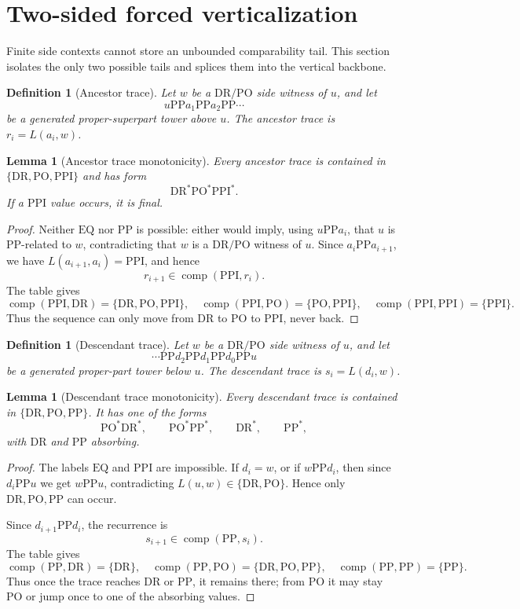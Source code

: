 \documentclass[11pt]{article}
\newtheorem{lemma}[theorem]{Lemma}
\newtheorem{definition}[theorem]{Definition}
\newcommand{\comp}{\operatorname{comp}}
\newcommand{\PP}{\mathrm{PP}}
\newcommand{\PPI}{\mathrm{PPI}}
\newcommand{\DR}{\mathrm{DR}}
\newcommand{\PO}{\mathrm{PO}}
\newcommand{\EQ}{\mathrm{EQ}}
\begin{document}
\section{Two-sided forced verticalization}

Finite side contexts cannot store an unbounded comparability tail.  This section isolates the only two possible tails and splices them into the vertical backbone.

\begin{definition}[Ancestor trace]
Let $w$ be a $\DR/\PO$ side witness of $u$, and let
\[
   u\PP a_1\PP a_2\PP\cdots
\]
be a generated proper-superpart tower above $u$.  The ancestor trace is $r_i=L(a_i,w)$.
\end{definition}

\begin{lemma}[Ancestor trace monotonicity]
\label{lem:ancestor-trace}
Every ancestor trace is contained in $\{\DR,\PO,\PPI\}$ and has form
\[
  \DR^*\PO^*\PPI^*.
\]
If a $\PPI$ value occurs, it is final.
\end{lemma}

\begin{proof}
Neither $\EQ$ nor $\PP$ is possible: either would imply, using $u\PP a_i$, that $u$ is $\PP$-related to $w$, contradicting that $w$ is a $\DR/\PO$ witness of $u$.  Since $a_i\PP a_{i+1}$, we have $L(a_{i+1},a_i)=\PPI$, and hence
\[
 r_{i+1}\in\comp(\PPI,r_i).
\]
The table gives
\[
 \comp(\PPI,\DR)=\{\DR,\PO,\PPI\},\quad
 \comp(\PPI,\PO)=\{\PO,\PPI\},\quad
 \comp(\PPI,\PPI)=\{\PPI\}.
\]
Thus the sequence can only move from $\DR$ to $\PO$ to $\PPI$, never back.
\end{proof}

\begin{definition}[Descendant trace]
Let $w$ be a $\DR/\PO$ side witness of $u$, and let
\[
   \cdots\PP d_2\PP d_1\PP d_0\PP u
\]
be a generated proper-part tower below $u$.  The descendant trace is $s_i=L(d_i,w)$.
\end{definition}

\begin{lemma}[Descendant trace monotonicity]
\label{lem:descendant-trace}
Every descendant trace is contained in $\{\DR,\PO,\PP\}$.  It has one of the forms
\[
   \PO^*\DR^*,\qquad \PO^*\PP^*,\qquad \DR^*,\qquad \PP^*,
\]
with $\DR$ and $\PP$ absorbing.
\end{lemma}

\begin{proof}
The labels $\EQ$ and $\PPI$ are impossible.  If $d_i=w$, or if $w\PP d_i$, then since $d_i\PP u$ we get $w\PP u$, contradicting $L(u,w)\in\{\DR,\PO\}$.  Hence only $\DR,\PO,\PP$ can occur.

Since $d_{i+1}\PP d_i$, the recurrence is
\[
  s_{i+1}\in\comp(\PP,s_i).
\]
The table gives
\[
 \comp(\PP,\DR)=\{\DR\},\quad
 \comp(\PP,\PO)=\{\DR,\PO,\PP\},\quad
 \comp(\PP,\PP)=\{\PP\}.
\]
Thus once the trace reaches $\DR$ or $\PP$, it remains there; from $\PO$ it may stay $\PO$ or jump once to one of the absorbing values.
\end{proof}
\end{document}
